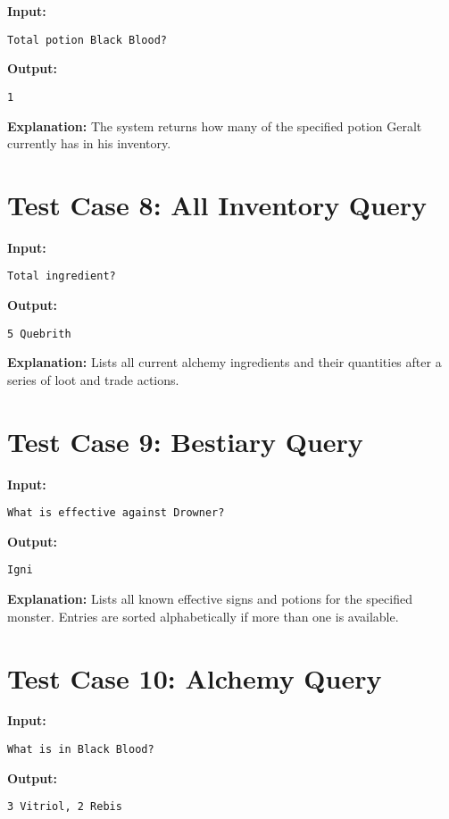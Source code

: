 \documentclass{article}
\begin{document}
\textbf{Input:}
\begin{lstlisting}
Total potion Black Blood?
\end{lstlisting}

\textbf{Output:}
\begin{lstlisting}
1
\end{lstlisting}

\textbf{Explanation:} The system returns how many of the specified potion Geralt currently has in his inventory.

\section*{Test Case 8: All Inventory Query}

\textbf{Input:}
\begin{lstlisting}
Total ingredient?
\end{lstlisting}

\textbf{Output:}
\begin{lstlisting}
5 Quebrith
\end{lstlisting}

\textbf{Explanation:} Lists all current alchemy ingredients and their quantities after a series of loot and trade actions.

\section*{Test Case 9: Bestiary Query}

\textbf{Input:}
\begin{lstlisting}
What is effective against Drowner?
\end{lstlisting}

\textbf{Output:}
\begin{lstlisting}
Igni
\end{lstlisting}

\textbf{Explanation:} Lists all known effective signs and potions for the specified monster. Entries are sorted alphabetically if more than one is available.

\section*{Test Case 10: Alchemy Query}

\textbf{Input:}
\begin{lstlisting}
What is in Black Blood?
\end{lstlisting}

\textbf{Output:}
\begin{lstlisting}
3 Vitriol, 2 Rebis
\end{lstlisting}
\end{document}
